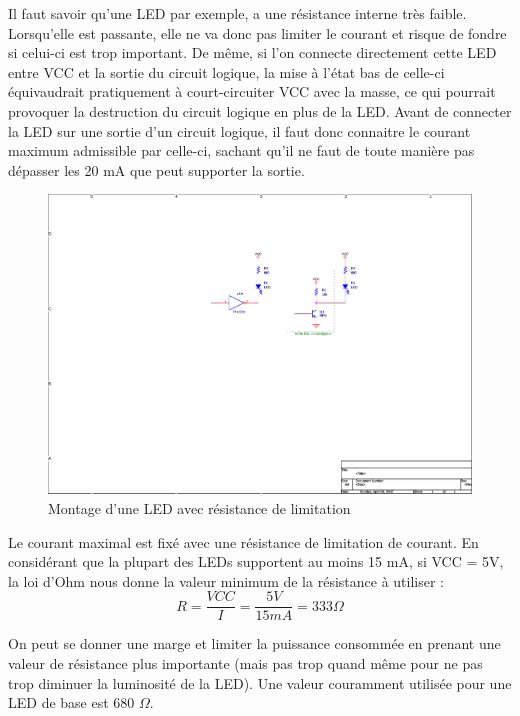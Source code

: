 \documentclass[a4paper]{article}
\begin{document}
Il faut savoir qu'une \ac{LED} par exemple, a une résistance interne très faible. Lorsqu'elle est passante, elle ne va donc pas limiter le courant et risque de fondre si celui-ci est trop important. De même, si l'on connecte directement cette \ac{LED} entre VCC et la sortie du circuit logique, la mise à l'état bas de celle-ci équivaudrait pratiquement à court-circuiter VCC avec la masse, ce qui pourrait provoquer la destruction du circuit logique en plus de la \ac{LED}. Avant de connecter la \ac{LED} sur une sortie d'un circuit logique, il faut donc connaitre le courant maximum admissible par celle-ci, sachant qu'il ne faut de toute manière pas dépasser les 20 mA que peut supporter la sortie.

\begin{figure}[H]
	\centering
	\includegraphics[scale=1.00]{Images/Montage_LED_resistance_limitation}
	\caption{Montage d'une \ac{LED} avec résistance de limitation
		\label{Montage_LED_resistance_limitation}}
\end{figure}

Le courant maximal est fixé avec une résistance de limitation de courant. En considérant que la plupart des \acp{LED} supportent au moins 15 mA, si VCC = 5V, la loi d'Ohm nous donne la valeur minimum de la résistance à utiliser :
\[R = \frac{VCC}{I} = \frac{5 V}{15 mA} = 333 \Omega\]

On peut se donner une marge et limiter la puissance consommée en prenant une valeur de résistance plus importante (mais pas trop quand même pour ne pas trop diminuer la luminosité de la \ac{LED}). Une valeur couramment utilisée pour une \ac{LED} de base est 680 $\Omega$.
\end{document}
